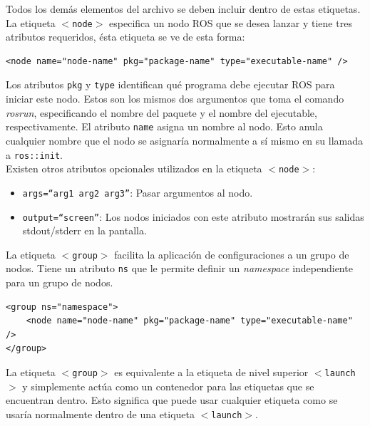 \documentclass[a4paper,usenames,dvipsnames,svgnames,table]{book}
\begin{document}
Todos los demás elementos del archivo se deben incluir dentro de estas etiquetas.\\

La etiqueta \texttt{$ < $node$ > $} especifica un nodo ROS que se desea lanzar y tiene tres atributos requeridos, ésta etiqueta se ve de esta forma:

\begin{verbatim}
<node name="node-name" pkg="package-name" type="executable-name" />
\end{verbatim}

Los atributos \texttt{pkg} y \texttt{type} identifican qué programa debe ejecutar ROS para iniciar este nodo. Estos son los mismos dos argumentos que toma el comando \textit{rosrun}, especificando el nombre del paquete y el nombre del ejecutable, respectivamente. El atributo \texttt{name} asigna un nombre al nodo. Esto anula cualquier nombre que el nodo se asignaría normalmente a sí mismo en su llamada a \texttt{ros::init}.\\

Existen otros atributos opcionales utilizados en la etiqueta \texttt{$ < $node$ > $}:
\begin{itemize}
\item \texttt{args=``arg1 arg2 arg3''}: Pasar argumentos al nodo.
\item \texttt{output=``screen''}: Los nodos iniciados con este atributo mostrarán sus salidas stdout/stderr  en la pantalla.
\end{itemize}
 

La etiqueta \texttt{$ < $group$ > $} facilita la aplicación de configuraciones a un grupo de nodos. Tiene un atributo \texttt{ns} que le permite definir un \textit{namespace} independiente para un grupo de nodos.

\begin{verbatim}
<group ns="namespace">
	<node name="node-name" pkg="package-name" type="executable-name" />
</group>
\end{verbatim}

La etiqueta \texttt{$ < $group$ > $} es equivalente a la etiqueta de nivel superior \texttt{$ < $launch$ > $} y simplemente actúa como un contenedor para las etiquetas que se encuentran dentro. Esto significa que puede usar cualquier etiqueta como se usaría normalmente dentro de una etiqueta \texttt{$ < $launch$ > $}.\\
\end{document}
